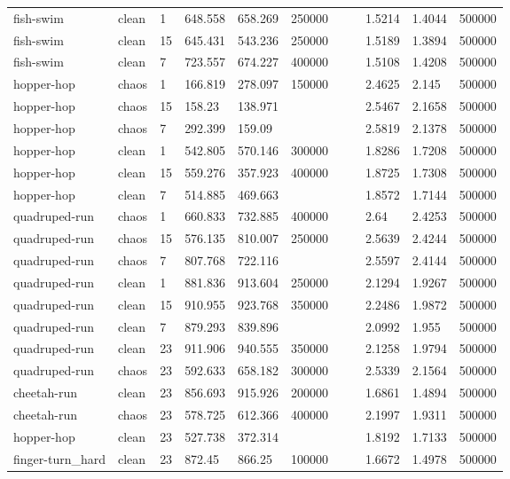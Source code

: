 \begin{tabular}{lllllllllll}
fish-swim & clean & 1 & 648.558 & 658.269 & 250000 &  &  & 1.5214 & 1.4044 & 500000 \\
fish-swim & clean & 15 & 645.431 & 543.236 & 250000 &  &  & 1.5189 & 1.3894 & 500000 \\
fish-swim & clean & 7 & 723.557 & 674.227 & 400000 &  &  & 1.5108 & 1.4208 & 500000 \\
hopper-hop & chaos & 1 & 166.819 & 278.097 & 150000 &  &  & 2.4625 & 2.145 & 500000 \\
hopper-hop & chaos & 15 & 158.23 & 138.971 &  &  &  & 2.5467 & 2.1658 & 500000 \\
hopper-hop & chaos & 7 & 292.399 & 159.09 &  &  &  & 2.5819 & 2.1378 & 500000 \\
hopper-hop & clean & 1 & 542.805 & 570.146 & 300000 &  &  & 1.8286 & 1.7208 & 500000 \\
hopper-hop & clean & 15 & 559.276 & 357.923 & 400000 &  &  & 1.8725 & 1.7308 & 500000 \\
hopper-hop & clean & 7 & 514.885 & 469.663 &  &  &  & 1.8572 & 1.7144 & 500000 \\
quadruped-run & chaos & 1 & 660.833 & 732.885 & 400000 &  &  & 2.64 & 2.4253 & 500000 \\
quadruped-run & chaos & 15 & 576.135 & 810.007 & 250000 &  &  & 2.5639 & 2.4244 & 500000 \\
quadruped-run & chaos & 7 & 807.768 & 722.116 &  &  &  & 2.5597 & 2.4144 & 500000 \\
quadruped-run & clean & 1 & 881.836 & 913.604 & 250000 &  &  & 2.1294 & 1.9267 & 500000 \\
quadruped-run & clean & 15 & 910.955 & 923.768 & 350000 &  &  & 2.2486 & 1.9872 & 500000 \\
quadruped-run & clean & 7 & 879.293 & 839.896 &  &  &  & 2.0992 & 1.955 & 500000 \\
quadruped-run & clean & 23 & 911.906 & 940.555 & 350000 &  &  & 2.1258 & 1.9794 & 500000 \\
quadruped-run & chaos & 23 & 592.633 & 658.182 & 300000 &  &  & 2.5339 & 2.1564 & 500000 \\
cheetah-run & clean & 23 & 856.693 & 915.926 & 200000 &  &  & 1.6861 & 1.4894 & 500000 \\
cheetah-run & chaos & 23 & 578.725 & 612.366 & 400000 &  &  & 2.1997 & 1.9311 & 500000 \\
hopper-hop & clean & 23 & 527.738 & 372.314 &  &  &  & 1.8192 & 1.7133 & 500000 \\
finger-turn\_hard & clean & 23 & 872.45 & 866.25 & 100000 &  &  & 1.6672 & 1.4978 & 500000 \\

\end{tabular}
